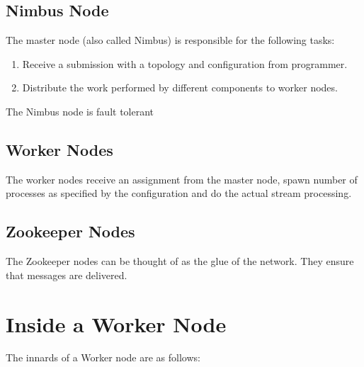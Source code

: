 \documentclass[bsc,logo,frontabs,twoside,singlespacing,normalheadings,parskip]{infthesis}     %
\begin{document}
\subsection{Nimbus Node}

The master node (also called Nimbus) is responsible for the following tasks:

\begin{enumerate}
	\item Receive a submission with a topology and configuration from programmer.
	\item Distribute the work performed by different components to worker nodes.
\end{enumerate}

The Nimbus node is fault tolerant

\subsection{Worker Nodes}

The worker nodes receive an assignment from the master node, spawn number of processes as specified by the configuration and do the actual stream processing.

\subsection{Zookeeper Nodes}

The Zookeeper nodes can be thought of as the glue of the network. They ensure that messages are delivered.

\section{Inside a Worker Node}

The innards of a Worker node are as follows:
\end{document}
